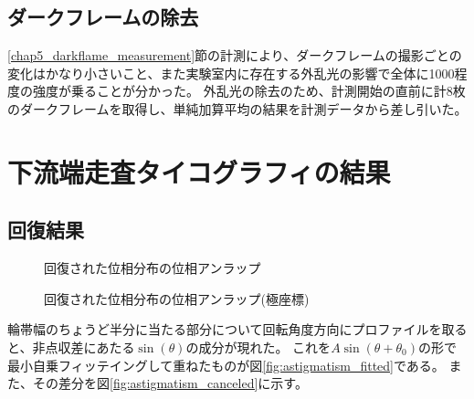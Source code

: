 \subsection{ダークフレームの除去}
\ref{chap5_darkflame_measurement}節の計測により、ダークフレームの撮影ごとの変化はかなり小さいこと、また実験室内に存在する外乱光の影響で全体に1000程度の強度が乗ることが分かった。
外乱光の除去のため、計測開始の直前に計8枚のダークフレームを取得し、単純加算平均の結果を計測データから差し引いた。

\clearpage

\newpage

\section{下流端走査タイコグラフィの結果}
\label{chap5_mirror_transverse_result}

\subsection{回復結果}

\begin{figure}[!ht]
\centering
{}
\caption[]{回復された位相分布の位相アンラップ}
\label{fig:reconstructed_phase_unwrapping}
\end{figure}


\begin{figure}[!ht]
\centering
{}
\caption[]{回復された位相分布の位相アンラップ(極座標)}
\label{fig:reconstructed_phase_unwrapping_polar}
\end{figure}

輪帯幅のちょうど半分に当たる部分について回転角度方向にプロファイルを取ると、非点収差にあたる$\sin(\theta)$の成分が現れた。
これを$A \sin(\theta + \theta_0)$の形で最小自乗フィッテイングして重ねたものが図\ref{fig:astigmatism_fitted}である。
また、その差分を図\ref{fig:astigmatism_canceled}に示す。

